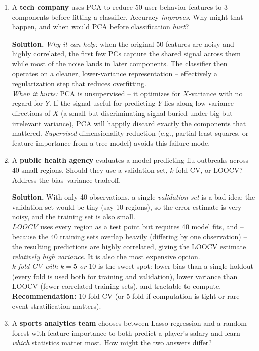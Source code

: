 \documentclass[11pt]{article}
\newcommand{\solution}[1]{%
  \par\medskip\noindent\textbf{Solution.} #1\par\medskip
}
\begin{document}
\begin{enumerate}[leftmargin=*]
\item A \textbf{tech company} uses PCA to reduce 50 user-behavior features to 3 components before fitting a classifier. Accuracy \emph{improves}. Why might that happen, and when would PCA before classification \emph{hurt}?

\solution{\emph{Why it can help:} when the original 50 features are noisy and highly correlated, the first few PCs capture the shared signal across them while most of the noise lands in later components. The classifier then operates on a cleaner, lower-variance representation -- effectively a regularization step that reduces overfitting.\\
\emph{When it hurts:} PCA is unsupervised -- it optimizes for $X$-variance with no regard for $Y$. If the signal useful for predicting $Y$ lies along low-variance directions of $X$ (a small but discriminating signal buried under big but irrelevant variance), PCA will happily discard exactly the components that mattered. \emph{Supervised} dimensionality reduction (e.g., partial least squares, or feature importance from a tree model) avoids this failure mode.}

\item A \textbf{public health agency} evaluates a model predicting flu outbreaks across 40 small regions. Should they use a validation set, $k$-fold CV, or LOOCV? Address the bias--variance tradeoff.

\solution{With only 40 observations, a single \emph{validation set} is a bad idea: the validation set would be tiny (say 10 regions), so the error estimate is very noisy, and the training set is also small.\\
\emph{LOOCV} uses every region as a test point but requires 40 model fits, and -- because the 40 training sets overlap heavily (differing by one observation) -- the resulting predictions are highly correlated, giving the LOOCV estimate \emph{relatively high variance}. It is also the most expensive option.\\
\emph{$k$-fold CV with $k = 5$ or $10$} is the sweet spot: lower bias than a single holdout (every fold is used both for training and validation), lower variance than LOOCV (fewer correlated training sets), and tractable to compute.\\
\textbf{Recommendation:} 10-fold CV (or 5-fold if computation is tight or rare-event stratification matters).}

\item A \textbf{sports analytics team} chooses between Lasso regression and a random forest with feature importance to both predict a player's salary and learn \emph{which} statistics matter most. How might the two answers differ?


\end{enumerate}
\end{document}
